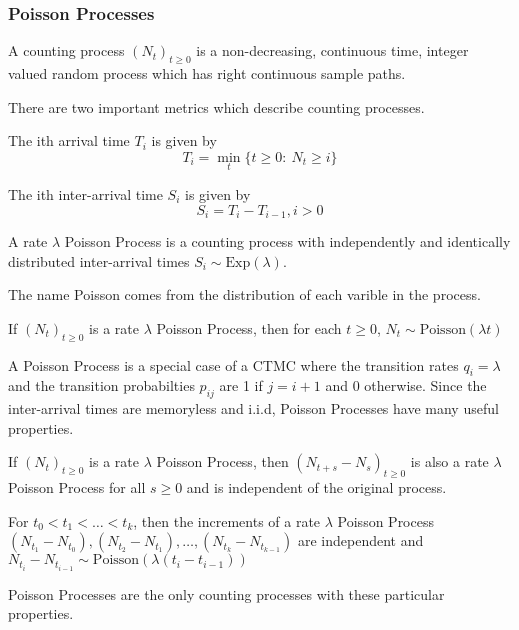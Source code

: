 \subsubsection{Poisson Processes}
\begin{definition}
	A counting process $(N_t)_{t\geq 0}$ is a non-decreasing, continuous time, integer valued random process which has right continuous sample paths.
	\label{defn:counting-process}
\end{definition}
There are two important metrics which describe counting processes.
\begin{definition}
	The ith arrival time $T_i$ is given by \[
		T_i = \min_t \{ t \geq 0: \ N_t \geq i \}
	\]
	\label{defn:arrival-time}
\end{definition}
\begin{definition}
	The ith inter-arrival time $S_i$ is given by \[
		S_i = T_i - T_{i-1}, i > 0
	\]
	\label{defn:inter-arrival-time}
\end{definition}
\begin{definition}
	A rate $\lambda$ Poisson Process is a counting process with independently and identically distributed inter-arrival times $S_i \sim \text{Exp}(\lambda)$.
	\label{defn:poisson-process}
\end{definition}
The name Poisson comes from the distribution of each varible in the process.
\begin{theorem}
	If $(N_t)_{t\geq 0}$ is a rate $\lambda$ Poisson Process, then for each $t\geq 0$, $N_t\sim \text{Poisson}(\lambda t)$
	\label{thm:poisson-process}
\end{theorem}
A Poisson Process is a special case of a CTMC where the transition rates $q_i = \lambda$ and the transition probabilties $p_{ij}$ are 1 if $j=i+1$ and 0 otherwise.
Since the inter-arrival times are memoryless and i.i.d, Poisson Processes have many useful properties.
\begin{theorem}
	If $(N_t)_{t\geq 0}$ is a rate $\lambda$ Poisson Process, then $(N_{t+s} - N_s)_{t\geq0}$ is also a rate $\lambda$ Poisson Process for all $s \geq 0$ and is independent of the original process.
	\label{thm:indep-poisson-process}
\end{theorem}
\begin{theorem}
	For $t_0 < t_1 <\ldots< t_k$, then the increments of a rate $\lambda$ Poisson Process $(N_{t_1} - N_{t_0}), (N_{t_2} - N_{t_1}),\ldots,(N_{t_k} - N_{t_{k-1}})$ are independent and $N_{t_i} - N_{t_{i-1}} \sim \text{Poisson}(\lambda(t_i - t_{i-1}))$
	\label{thm:indep-increments}
\end{theorem}
Poisson Processes are the only counting processes with these particular properties.

